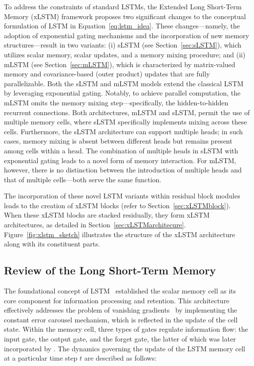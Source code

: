 To address the constraints of standard LSTMs, the Extended Long Short-Term Memory (xLSTM) framework proposes two significant changes to the conceptual formulation of LSTM in Equation~\eqref{eq:lstm_idea}. These changes—namely, the adoption of exponential gating mechanisms and the incorporation of new memory structures—result in two variants: (i) sLSTM (see Section~\ref{sec:sLSTM}), which utilizes scalar memory, scalar updates, and a memory mixing procedure; and (ii) mLSTM (see Section~\ref{sec:mLSTM}), which is characterized by matrix-valued memory and covariance-based (outer product) updates that are fully parallelizable. Both the sLSTM and mLSTM models extend the classical LSTM by leveraging exponential gating. Notably, to achieve parallel computation, the mLSTM omits the memory mixing step—specifically, the hidden-to-hidden recurrent connections. Both architectures, mLSTM and sLSTM, permit the use of multiple memory cells, where sLSTM specifically implements mixing across these cells. Furthermore, the sLSTM architecture can support multiple heads; in such cases, memory mixing is absent between different heads but remains present among cells within a head. The combination of multiple heads in sLSTM with exponential gating leads to a novel form of memory interaction. For mLSTM, however, there is no distinction between the introduction of multiple heads and that of multiple cells—both serve the same function.

The incorporation of these novel LSTM variants within residual block modules leads to the creation of xLSTM blocks (refer to Section~\ref{sec:xLSTMblock}). When these xLSTM blocks are stacked residually, they form xLSTM architectures, as detailed in Section~\ref{sec:xLSTMarchitecure}. Figure~\ref{fig:xlstm_sketch} illustrates the structure of the xLSTM architecture along with its constituent parts.

\subsection{Review of the Long Short-Term Memory}
\label{sec:orgLSTM}

The foundational concept of LSTM~\citep{Hochreiter:91,Hochreiter:97nips,Hochreiter:97} established the scalar memory cell as its core component for information processing and retention. This architecture effectively addresses the problem of vanishing gradients~\citep{Hochreiter:91,Hochreiter:00book} by implementing the constant error carousel mechanism, which is reflected in the update of the cell state. Within the memory cell, three types of gates regulate information flow: the input gate, the output gate, and the forget gate, the latter of which was later incorporated by \citet{Gers:00}. The dynamics governing the update of the LSTM memory cell at a particular time step $t$ are described as follows:


